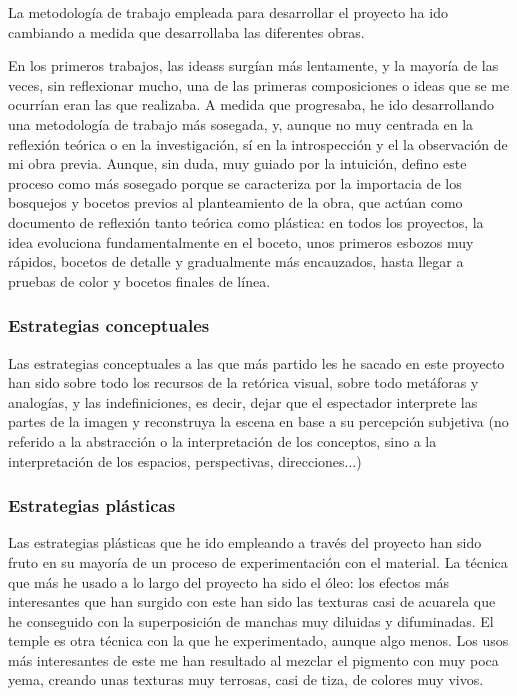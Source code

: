 \documentclass[twoside,twocolumn]{article}
\begin{document}
La metodología de trabajo empleada para desarrollar el proyecto ha ido
cambiando a medida que desarrollaba las diferentes obras.

En los primeros trabajos, las ideass surgían más lentamente, y la
mayoría de las veces, sin reflexionar mucho, una de las primeras
composiciones o ideas que se me ocurrían eran las que realizaba. A
medida que progresaba, he ido desarrollando una metodología de trabajo
más sosegada, y, aunque no muy centrada en la reflexión teórica o en la
investigación, sí en la introspección y el la observación de mi obra
previa. Aunque, sin duda, muy guiado por la intuición, defino este
proceso como más sosegado porque se caracteriza por la importacia de los
bosquejos y bocetos previos al planteamiento de la obra, que actúan como
documento de reflexión tanto teórica como plástica: en todos los
proyectos, la idea evoluciona fundamentalmente en el boceto, unos
primeros esbozos muy rápidos, bocetos de detalle y gradualmente más
encauzados, hasta llegar a pruebas de color y bocetos finales de línea.

\hypertarget{estrategias-conceptuales}{%
\subsubsection{Estrategias conceptuales}\label{estrategias-conceptuales}}

Las estrategias conceptuales a las que más partido les he sacado en este
proyecto han sido sobre todo los recursos de la retórica visual, sobre
todo metáforas y analogías, y las indefiniciones, es decir, dejar que el
espectador interprete las partes de la imagen y reconstruya la escena en
base a su percepción subjetiva (no referido a la abstracción o la
interpretación de los conceptos, sino a la interpretación de los
espacios, perspectivas, direcciones...)

\hypertarget{estrategias-pluxe1sticas}{%
\subsubsection{Estrategias plásticas}\label{estrategias-pluxe1sticas}}

Las estrategias plásticas que he ido empleando a través del proyecto han
sido fruto en su mayoría de un proceso de experimentación con el
material. La técnica que más he usado a lo largo del proyecto ha sido el
óleo: los efectos más interesantes que han surgido con este han sido las
texturas casi de acuarela que he conseguido con la superposición de
manchas muy diluidas y difuminadas. El temple es otra técnica con la que
he experimentado, aunque algo menos. Los usos más interesantes de este
me han resultado al mezclar el pigmento con muy poca yema, creando unas
texturas muy terrosas, casi de tiza, de colores muy vivos.
\end{document}
